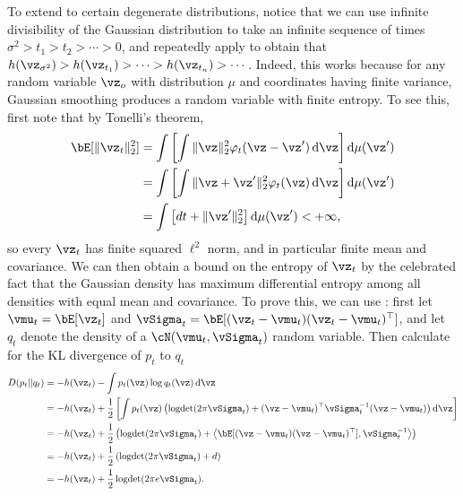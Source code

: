 \documentclass[../../book-main.tex]{subfiles}
\begin{document}
\begin{remark}\label{rem:gaussian-maxent}
  To extend  to certain degenerate
  distributions,
  notice that we can use infinite divisibility of the Gaussian distribution to
  take an infinite sequence of times $\sigma^2 > t_1 > t_2 > \cdots > 0$, and
  repeatedly apply  to obtain that
  $h(\vz_{\sigma^2}) > h(\vz_{t_1}) > \cdots > h(\vz_{t_n}) > \cdots$.
  Indeed, this works because for any random variable $\vz_o$ with distribution
  $\mu$ and coordinates having finite variance, Gaussian smoothing produces
  a random variable with finite entropy. To see this, first note that by
  Tonelli's theorem,
  \begin{align*}
    \bE[\norm{\vz_t}_2^2] 
    &= \int \left[ \int \norm{\vz}_2^2 \varphi_t(\vz - \vz') \odif \vz
    \right] \odif \mu(\vz')\\
    &= \int \left[ \int \norm{\vz + \vz'}_2^2 \varphi_t(\vz) \odif \vz
    \right] \odif \mu(\vz')\\
    &= \int\left[dt + \norm{\vz'}_2^2 \right]\odif \mu(\vz') <+\infty,
  \end{align*}
  so every $\vz_t$ has finite squared $\ell^2$ norm, and in particular finite
  mean and covariance.
  We can then obtain a bound on the entropy of $\vz_t$ by the celebrated fact
  that the Gaussian density has maximum differential entropy among all densities
  with equal mean and covariance.
  To prove this, we can use : first let $\vmu_t
  = \bE[\vz_t]$ and $\vSigma_t = \bE[(\vz_t-\vmu_t) (\vz_t-\vmu_t)^\top]$, and let $q_t$ denote
  the density of a $\cN(\vmu_t, \vSigma_t)$ random variable.
  Then calculate for the KL divergence of $p_t$ to $q_t$
  \begin{align*}
    D(p_t || q_t) 
    &= 
    -h(\vz_t) - \int p_t(\vz) \log q_t(\vz) \odif \vz
    \\
    &=
    -h(\vz_t) + \frac{1}{2}\left[
      \int p_t(\vz) \left( \logdet(2\pi \vSigma_t) + (\vz - \vmu_t)^\top \vSigma_t^{-1} (\vz - \vmu_t) \right)\odif \vz
    \right]
  \\
    &= -h(\vz_t) + \frac{1}{2} \left(
      \logdet(2\pi \vSigma_t) 
      + \ip*{\bE[(\vz - \vmu_t)(\vz - \vmu_t)^\top]}{\vSigma_t^{-1}}
    \right)
    \\
    &= -h(\vz_t) + \frac{1}{2} \left(
      \logdet(2\pi \vSigma_t) 
      + d
    \right)
    \\
    &= -h(\vz_t) + \frac{1}{2} \logdet(2\pi e \vSigma_t).
  \end{align*}

\end{remark}
\end{document}

